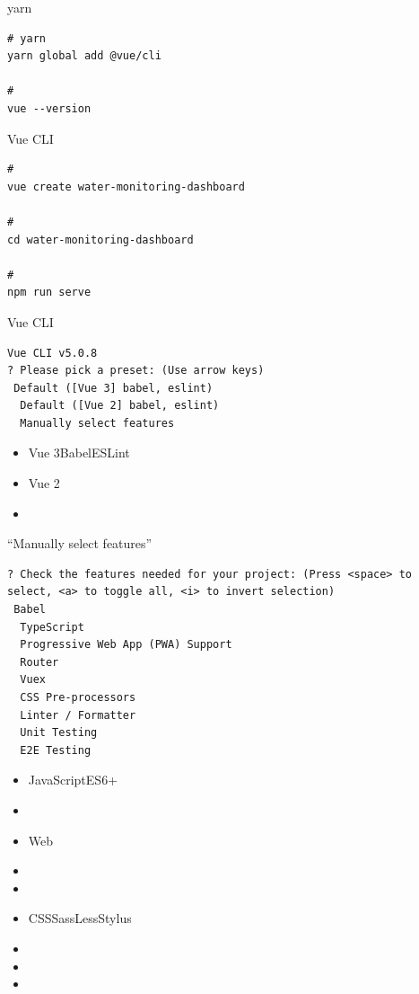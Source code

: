 yarn

\begin{lstlisting}[style=terminal]
# yarn
yarn global add @vue/cli

# 
vue --version
\end{lstlisting}


Vue CLI

\begin{lstlisting}[style=terminal]
# 
vue create water-monitoring-dashboard

# 
cd water-monitoring-dashboard

# 
npm run serve
\end{lstlisting}

Vue CLI

\begin{lstlisting}[style=terminal]
Vue CLI v5.0.8
? Please pick a preset: (Use arrow keys)
 Default ([Vue 3] babel, eslint) 
  Default ([Vue 2] babel, eslint) 
  Manually select features
\end{lstlisting}

\important{}

\begin{itemize}
\item
  Vue 3BabelESLint
\item
  Vue 2
\item
\end{itemize}

``Manually select features''

\begin{lstlisting}[style=terminal]
? Check the features needed for your project: (Press <space> to select, <a> to toggle all, <i> to invert selection)
 Babel
  TypeScript
  Progressive Web App (PWA) Support
  Router
  Vuex
  CSS Pre-processors
  Linter / Formatter
  Unit Testing
  E2E Testing
\end{lstlisting}

\important{}

\begin{itemize}
\item
  JavaScriptES6+
\item
\item
  Web
\item
\item
\item
  CSSSassLessStylus
\item
\item
\item
\end{itemize}

